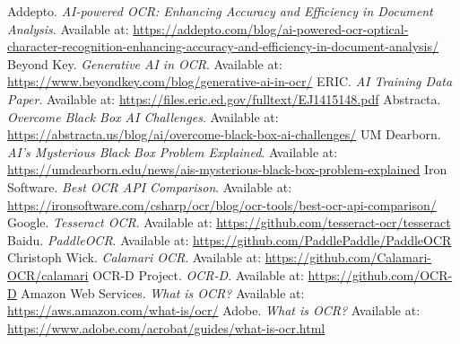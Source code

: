 \begin{thebibliography}{99}
 Addepto. \textit{AI-powered OCR: Enhancing Accuracy and Efficiency in Document Analysis}. Available at: \url{https://addepto.com/blog/ai-powered-ocr-optical-character-recognition-enhancing-accuracy-and-efficiency-in-document-analysis/}
 Beyond Key. \textit{Generative AI in OCR}. Available at: \url{https://www.beyondkey.com/blog/generative-ai-in-ocr/}
 ERIC. \textit{AI Training Data Paper}. Available at: \url{https://files.eric.ed.gov/fulltext/EJ1415148.pdf}
 Abstracta. \textit{Overcome Black Box AI Challenges}. Available at: \url{https://abstracta.us/blog/ai/overcome-black-box-ai-challenges/}
 UM Dearborn. \textit{AI's Mysterious Black Box Problem Explained}. Available at: \url{https://umdearborn.edu/news/ais-mysterious-black-box-problem-explained}
 Iron Software. \textit{Best OCR API Comparison}. Available at: \url{https://ironsoftware.com/csharp/ocr/blog/ocr-tools/best-ocr-api-comparison/}
 Google. \textit{Tesseract OCR}. Available at: \url{https://github.com/tesseract-ocr/tesseract}
 Baidu. \textit{PaddleOCR}. Available at: \url{https://github.com/PaddlePaddle/PaddleOCR}
 Christoph Wick. \textit{Calamari OCR}. Available at: \url{https://github.com/Calamari-OCR/calamari}
 OCR-D Project. \textit{OCR-D}. Available at: \url{https://github.com/OCR-D}
 Amazon Web Services. \textit{What is OCR?} Available at: \url{https://aws.amazon.com/what-is/ocr/}
 Adobe. \textit{What is OCR?} Available at: \url{https://www.adobe.com/acrobat/guides/what-is-ocr.html}

\end{thebibliography}
